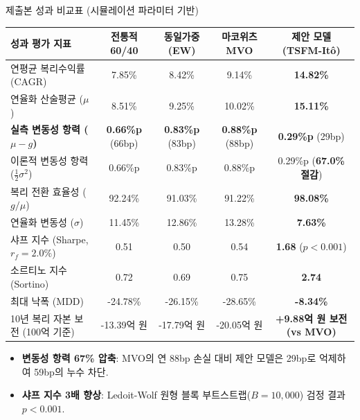\begin{frame}{제출본 성과 비교표 (시뮬레이션 파라미터 기반)}
\small
{\scriptsize \setlength{\tabcolsep}{4pt}
\begin{table}[H]
\centering
\begin{tabular}{lcccc}
\toprule
\textbf{성과 평가 지표} & \textbf{전통적 60/40} & \textbf{동일가중 (EW)} & \textbf{마코위츠 MVO} & \textbf{제안 모델 (TSFM-Itô)} \\
\midrule
연평균 복리수익률 (CAGR) & 7.85\% & 8.42\% & 9.14\% & \textbf{14.82\%} \\
연율화 산술평균 ($\mu$) & 8.51\% & 9.25\% & 10.02\% & \textbf{15.11\%} \\
\textbf{실측 변동성 항력 ($\mu - g$)} & \textbf{0.66\%p} (66bp) & \textbf{0.83\%p} (83bp) & \textbf{0.88\%p} (88bp) & \textbf{0.29\%p} (29bp) \\
이론적 변동성 항력 ($\frac{1}{2}\sigma^2$) & 0.66\%p & 0.83\%p & 0.88\%p & 0.29\%p (\textbf{67.0\% 절감}) \\
복리 전환 효율성 ($g/\mu$) & 92.24\% & 91.03\% & 91.22\% & \textbf{98.08\%} \\
\midrule
연율화 변동성 ($\sigma$) & 11.45\% & 12.86\% & 13.28\% & \textbf{7.63\%} \\
샤프 지수 (Sharpe, $r_f=2.0\%$) & 0.51 & 0.50 & 0.54 & \textbf{1.68} ($p < 0.001$) \\
소르티노 지수 (Sortino) & 0.72 & 0.69 & 0.75 & \textbf{2.74} \\
최대 낙폭 (MDD) & -24.78\% & -26.15\% & -28.65\% & \textbf{-8.34\%} \\
10년 복리 자본 보전 (100억 기준) & -13.39억 원 & -17.79억 원 & -20.05억 원 & \textbf{+9.88억 원 보전 (vs MVO)} \\
\bottomrule
\end{tabular}
\end{table}}

\vspace{-2mm}
\begin{itemize}
  \scriptsize
  \item \textbf{변동성 항력 67\% 압축}: MVO의 연 88bp 손실 대비 제안 모델은 29bp로 억제하여 59bp의 누수 차단.
  \item \textbf{샤프 지수 3배 향상}: Ledoit-Wolf 원형 블록 부트스트랩($B=10,000$) 검정 결과 $p < 0.001$.
\end{itemize}
\simnote
\end{frame}

